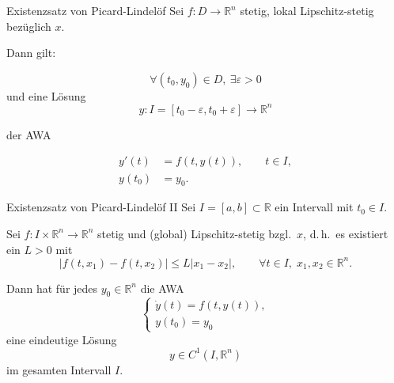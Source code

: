 \begin{satz}{Existenzsatz von Picard-Lindelöf}
    Sei $f\colon D\to\mathbb{R}^n$ stetig, lokal Lipschitz-stetig bezüglich $x$.

    Dann gilt:

    $$
    \forall (t_0,y_0)\in D,\ \exists \varepsilon>0
    $$
    und eine Lösung
    $$
    y\colon I=[t_0-\varepsilon,t_0+\varepsilon]\to\mathbb{R}^n
    $$

    der AWA

    \begin{align*}
    y'(t) &= f(t,y(t)),\qquad t\in I,\\
    y(t_0) &= y_0.
    \end{align*}    
\end{satz}

\begin{satz}{Existenzsatz von Picard-Lindelöf II}
    Sei $I=[a,b]\subset\mathbb{R}$ ein Intervall mit $t_0\in I$.
    \vspace{1em}
    
    Sei $f\colon I\times\mathbb{R}^n\to\mathbb{R}^n$ stetig und (global) Lipschitz-stetig bzgl.\ $x$, d.\,h.\ es existiert ein $L>0$ mit
    $$
    |f(t,x_1)-f(t,x_2)|\le L|x_1-x_2|,\qquad \forall t\in I,\; x_1,x_2\in\mathbb{R}^n.
    $$

    Dann hat für jedes $y_0\in\mathbb{R}^n$ die AWA
    $$
    \begin{cases}
    \dot y(t)=f(t,y(t)),\\[4pt]
    y(t_0)=y_0
    \end{cases}
    $$
    eine eindeutige Lösung
    $$
    y\in C^1(I,\mathbb{R}^n)
    $$
    im gesamten Intervall $I$.   
\end{satz}
